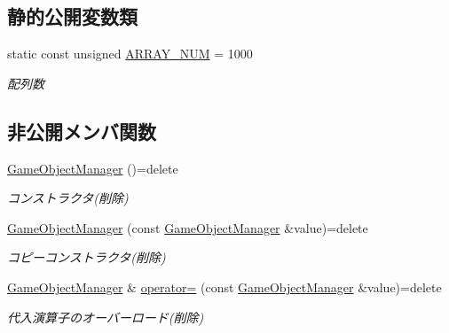 \subsection*{静的公開変数類}
\begin{DoxyCompactItemize}
\item 
static const unsigned \mbox{\hyperlink{class_game_object_manager_a591934d64d750c10c03c908371470681}{A\+R\+R\+A\+Y\+\_\+\+N\+UM}} = 1000
\begin{DoxyCompactList}\small\item\em 配列数 \end{DoxyCompactList}\end{DoxyCompactItemize}
\subsection*{非公開メンバ関数}
\begin{DoxyCompactItemize}
\item 
\mbox{\hyperlink{class_game_object_manager_aa5693c4aefc135e5e85140427c781d3e}{Game\+Object\+Manager}} ()=delete
\begin{DoxyCompactList}\small\item\em コンストラクタ(削除) \end{DoxyCompactList}\item 
\mbox{\hyperlink{class_game_object_manager_a8a8f9ec94ecca948fc7ab63454398e36}{Game\+Object\+Manager}} (const \mbox{\hyperlink{class_game_object_manager}{Game\+Object\+Manager}} \&value)=delete
\begin{DoxyCompactList}\small\item\em コピーコンストラクタ(削除) \end{DoxyCompactList}\item 
\mbox{\hyperlink{class_game_object_manager}{Game\+Object\+Manager}} \& \mbox{\hyperlink{class_game_object_manager_af66275734b2098dc631fdb789d31fd52}{operator=}} (const \mbox{\hyperlink{class_game_object_manager}{Game\+Object\+Manager}} \&value)=delete
\begin{DoxyCompactList}\small\item\em 代入演算子のオーバーロード(削除) \end{DoxyCompactList}\end{DoxyCompactItemize}
